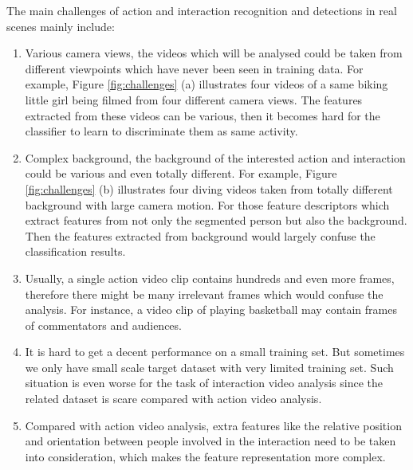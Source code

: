 \par
The main challenges of action and interaction recognition and detections in real scenes mainly include: 
\begin{enumerate}
	\item Various camera views, the videos which will be analysed could be taken from different viewpoints which have never been seen in training data. For example, Figure \ref{fig:challenges} (a) illustrates four videos of a same biking little girl being filmed from four different camera views. The features extracted from these videos can be various, then it becomes hard for the classifier to learn to discriminate them as same activity. 
	\item Complex background, the background of the interested action and interaction could be various and even totally different. For example, Figure \ref{fig:challenges} (b) illustrates four diving videos taken from totally different background with large camera motion. For those feature descriptors which extract features from not only the segmented person but also the background. Then the features extracted from background would largely confuse the classification results.  
	\item Usually, a single action video clip contains hundreds and even more frames, therefore there might be many irrelevant frames which would confuse the analysis. For instance, a video clip of playing basketball may contain frames of commentators and audiences. 
	\item It is hard to get a decent performance on a small training set. But sometimes we only have small scale target dataset with very limited training set. Such situation is even worse for the task of interaction video analysis since the related dataset is scare compared with action video analysis.
	\item Compared with action video analysis, extra features like the relative position and orientation between people involved in the interaction need to be taken into consideration, which makes the feature representation more complex. 
\end{enumerate}

